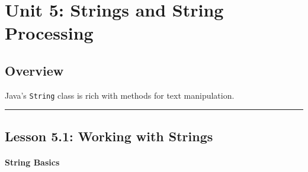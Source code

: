 \documentclass[
  justified,
  openright,
]{tufte-book}
\let\subsubsection\paragraph
\let\paragraph\paragraph
\let\subsubsection\paragraph
\let\paragraph\paragraph
\begin{document}
\newpage

\section{Unit 5: Strings and String
Processing}\label{unit-5-strings-and-string-processing-1}

\subsection{Overview}\label{overview-5}

Java's \texttt{String} class is rich with methods for text manipulation.

\begin{center}\rule{0.5\linewidth}{0.5pt}\end{center}

\subsection{Lesson 5.1: Working with
Strings}\label{lesson-5.1-working-with-strings}

\subsubsection{String Basics}\label{string-basics}
\end{document}
